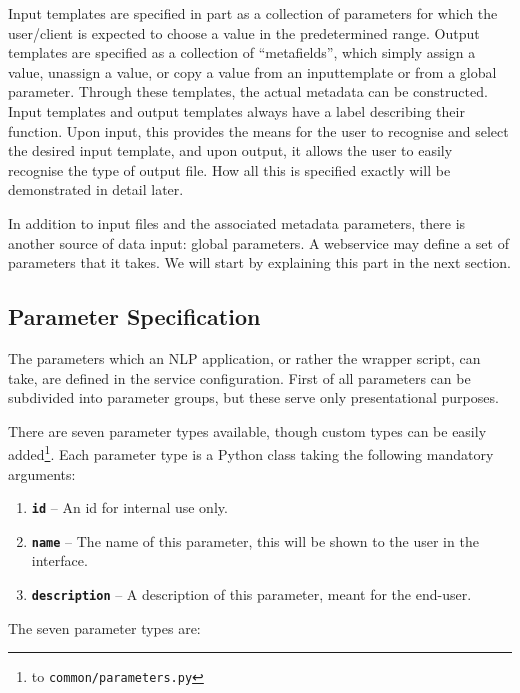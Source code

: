 \documentclass[a4paper,12pt]{report}
\begin{document}
Input templates are specified in part as a collection of parameters for which the user/client is expected to choose a value in the predetermined range. Output templates are specified as a collection of ``metafields'', which simply assign a value, unassign a value, or copy a value from an inputtemplate or from a global parameter. Through these templates, the actual metadata can be constructed. Input templates and output templates always have a label describing their function. Upon input, this provides the means for the user to recognise and select the desired input template, and upon output, it allows the user to easily recognise the type of output file. How all this is specified exactly will be demonstrated in detail later.

In addition to input files and the associated metadata parameters, there is another source of data input: global parameters. A webservice may define a set of parameters that it takes. We will start by explaining this part in the next section.


\subsection{Parameter Specification}
\label{sec:parameters}

The parameters which an NLP application, or rather the wrapper script, can take, are defined in the service configuration. First of all parameters can be subdivided into parameter groups, but these serve only presentational purposes. 

There are seven parameter types available, though custom types can be easily added\footnote{to \texttt{common/parameters.py}}. Each parameter type is a Python class taking the following mandatory arguments:

\begin{enumerate}
\item \textbf{\texttt{id}} -- An id for internal use only.
\item \textbf{\texttt{name}} -- The name of this parameter, this will be shown to the user in the interface.
\item \textbf{\texttt{description}} -- A description of this parameter, meant for the end-user.
\end{enumerate}

The seven parameter types are:
\end{document}
